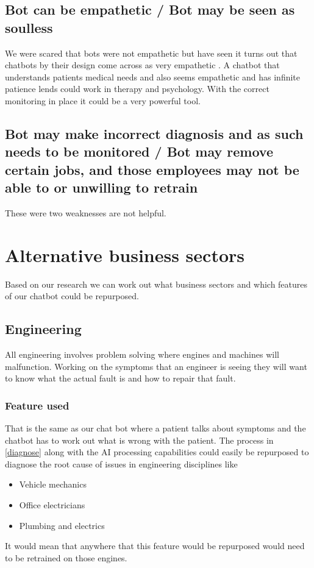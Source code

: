 \documentclass{article}
\begin{document}
\subsection{Bot can be empathetic / Bot may be seen as soulless}
We were scared that bots were not empathetic but have seen it turns out that chatbots by their design come across as very empathetic \cite{bedside}. A chatbot that understands patients medical needs and also seems empathetic and has infinite patience lends could work in therapy and psychology. With the correct monitoring in place it could be a very powerful tool. 

\subsection{Bot may make incorrect diagnosis and as such needs to be monitored / Bot may remove certain jobs, and those employees may not be able to or unwilling to retrain}
These were two weaknesses are not helpful.

\section{Alternative business sectors}
Based on our research we can work out what business sectors and which features of our chatbot could be repurposed.

\subsection{Engineering}
All engineering involves problem solving where engines and machines will malfunction. Working on the symptoms that an engineer is seeing they will want to know what the actual fault is and how to repair that fault. 

\subsubsection{Feature used}
That is the same as our chat bot where a patient talks about symptoms and the chatbot has to work out what is wrong with the patient. The process  in \ref{diagnose} along with the AI processing capabilities could easily be repurposed to diagnose the root cause of issues in engineering disciplines like
\begin{itemize}
    \item Vehicle mechanics
    \item Office electricians
    \item Plumbing and electrics
\end{itemize}
It would mean that anywhere that this feature would be repurposed would need to be retrained on those engines.
\end{document}
